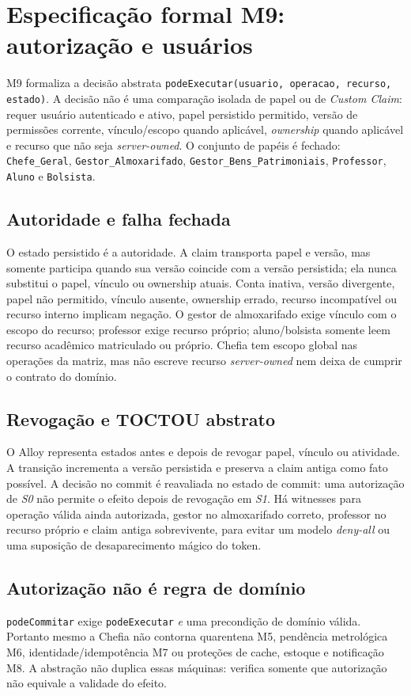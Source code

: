 \clearpage
\section{Especificação formal M9: autorização e usuários}
\label{sec:formal-m9}

M9 formaliza a decisão abstrata \texttt{podeExecutar(usuario, operacao,
recurso, estado)}. A decisão não é uma comparação isolada de papel ou de
\textit{Custom Claim}: requer usuário autenticado e ativo, papel persistido
permitido, versão de permissões corrente, vínculo/escopo quando aplicável,
\textit{ownership} quando aplicável e recurso que não seja \textit{server-owned}.
O conjunto de papéis é fechado: \texttt{Chefe\_Geral},
\texttt{Gestor\_Almoxarifado}, \texttt{Gestor\_Bens\_Patrimoniais},
\texttt{Professor}, \texttt{Aluno} e \texttt{Bolsista}.

\subsection*{Autoridade e falha fechada}
O estado persistido é a autoridade. A claim transporta papel e versão, mas
somente participa quando sua versão coincide com a versão persistida; ela nunca
substitui o papel, vínculo ou ownership atuais. Conta inativa, versão divergente,
papel não permitido, vínculo ausente, ownership errado, recurso incompatível ou
recurso interno implicam negação. O gestor de almoxarifado exige vínculo com o
escopo do recurso; professor exige recurso próprio; aluno/bolsista somente leem
recurso acadêmico matriculado ou próprio. Chefia tem escopo global nas operações
da matriz, mas não escreve recurso \textit{server-owned} nem deixa de cumprir o
contrato do domínio.

\subsection*{Revogação e TOCTOU abstrato}
O Alloy representa estados antes e depois de revogar papel, vínculo ou atividade.
A transição incrementa a versão persistida e preserva a claim antiga como fato
possível. A decisão no commit é reavaliada no estado de commit: uma autorização
de \textit{S0} não permite o efeito depois de revogação em \textit{S1}. Há
witnesses para operação válida ainda autorizada, gestor no almoxarifado correto,
professor no recurso próprio e claim antiga sobrevivente, para evitar um modelo
\textit{deny-all} ou uma suposição de desaparecimento mágico do token.

\subsection*{Autorização não é regra de domínio}
\texttt{podeCommitar} exige \texttt{podeExecutar} \emph{e} uma precondição de
domínio válida. Portanto mesmo a Chefia não contorna quarentena M5, pendência
metrológica M6, identidade/idempotência M7 ou proteções de cache, estoque e
notificação M8. A abstração não duplica essas máquinas: verifica somente que
autorização não equivale a validade do efeito.

